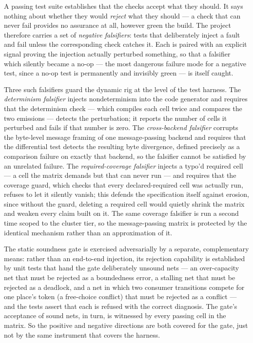 A passing test suite establishes that the checks accept what they should. It says
nothing about whether they would \emph{reject} what they should --- a check that
can never fail provides no assurance at all, however green the build. The project
therefore carries a set of \emph{negative falsifiers}: tests that deliberately
inject a fault and fail unless the corresponding check catches it. Each is paired
with an explicit signal proving the injection actually perturbed something, so that
a falsifier which silently became a no-op --- the most dangerous failure mode for a
negative test, since a no-op test is permanently and invisibly green --- is itself
caught.

Three such falsifiers guard the dynamic rig at the level of the test harness. The
\emph{determinism falsifier} injects nondeterminism into the code generator and
requires that the determinism check --- which compiles each cell twice and compares
the two emissions --- detects the perturbation; it reports the number of cells it
perturbed and fails if that number is zero. The \emph{cross-backend falsifier}
corrupts the byte-level message framing of one message-passing backend and
requires that the differential test detects the resulting byte divergence, defined
precisely as a comparison failure on exactly that backend, so the falsifier cannot
be satisfied by an unrelated failure. The \emph{required-coverage falsifier}
injects a typo'd required cell --- a cell the matrix demands but that can never run
--- and requires that the coverage guard, which checks that every declared-required
cell was actually run, refuses to let it silently vanish; this defends the
specification itself against erosion, since without the guard, deleting a required
cell would quietly shrink the matrix and weaken every claim built on it. The same
coverage falsifier is run a second time scoped to the cluster tier, so the
message-passing matrix is protected by the identical mechanism rather than an
approximation of it.

The static soundness gate is exercised adversarially by a separate, complementary
means: rather than an end-to-end injection, its rejection capability is established
by unit tests that hand the gate deliberately unsound nets --- an over-capacity net
that must be rejected as a boundedness error, a stalling net that must be rejected
as a deadlock, and a net in which two consumer transitions compete for one place's
token (a free-choice conflict) that must be rejected as a conflict --- and the tests
assert that each is refused with the correct diagnosis. The gate's acceptance of
sound nets, in turn, is witnessed by every passing cell in the matrix. So the
positive and negative directions are both covered for the gate, just not by the
same instrument that covers the harness.


